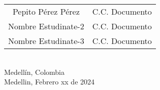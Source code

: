 \begin{titlepage}
\begin{minipage}{13.5cm}
{\begin{tabular}{cc}
Pepito Pérez Pérez & C.C. Documento\\
Nombre Estudinate-2 & C.C. Documento\\
Nombre Estudinate-3 & C.C. Documento\\
\end{tabular}
}\\[2.5cm]

{\large
Medellín, Colombia
}\\[0.3cm]

{\large
Medellin, Febrero xx de 2024
}

\end{minipage}

\vfill %

\end{titlepage}



